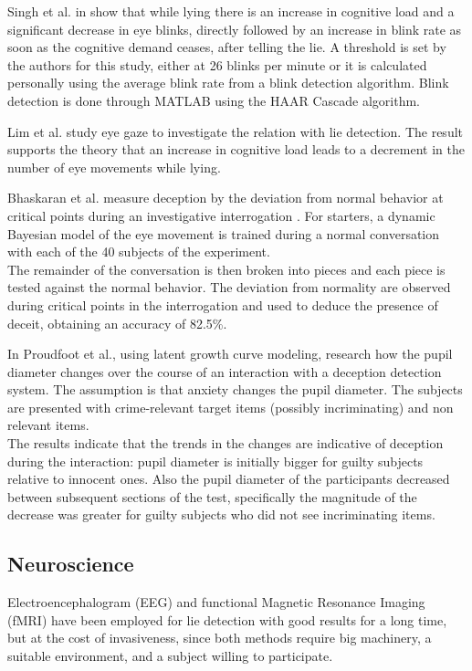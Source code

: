 Singh et al. in \cite{7324092} show that while lying there is an increase in cognitive load and a significant decrease in eye blinks, directly followed by an increase in blink rate as soon as the cognitive demand ceases, after telling the lie. A threshold is set by the authors for this study, either at 26 blinks per minute or it is calculated personally using the average blink rate from a blink detection algorithm. Blink detection is done through MATLAB using the HAAR Cascade algorithm.

Lim et al. study eye gaze \cite{Lim:2013:LTE:2535948.2535954} to investigate the relation with lie detection. The result supports the theory that an increase in cognitive load leads to a decrement in the number of eye movements while lying.

Bhaskaran et al. measure deception by the deviation from normal behavior at critical points during an investigative interrogation \cite{5771407} . For starters, a dynamic Bayesian model of the eye movement is trained during a normal conversation with each of the 40 subjects of the experiment. \\
The remainder of the conversation is then broken into pieces and each piece is tested against the normal behavior. The deviation from normality are observed during critical points in the interrogation and used to deduce the presence of deceit, obtaining an accuracy of 82.5\%.

In \cite{7165946} Proudfoot et al., using latent growth curve modeling, research how the pupil diameter changes over the course of an interaction with a deception detection system. The assumption is that anxiety changes the pupil diameter. The subjects are presented with crime-relevant target items (possibly incriminating) and non relevant items. \\
The results indicate that the trends in the changes are indicative of deception during the interaction: pupil diameter is initially bigger for guilty subjects relative to innocent ones. Also the pupil diameter of the participants decreased between subsequent sections of the test, specifically the magnitude of the decrease was greater for guilty subjects who did not see incriminating items.

\subsection{Neuroscience}
Electroencephalogram (EEG) and functional Magnetic Resonance Imaging (fMRI) have been employed for lie detection with good results for a long time, but at the cost of invasiveness, since both methods require big machinery, a suitable environment, and a subject willing to participate.

